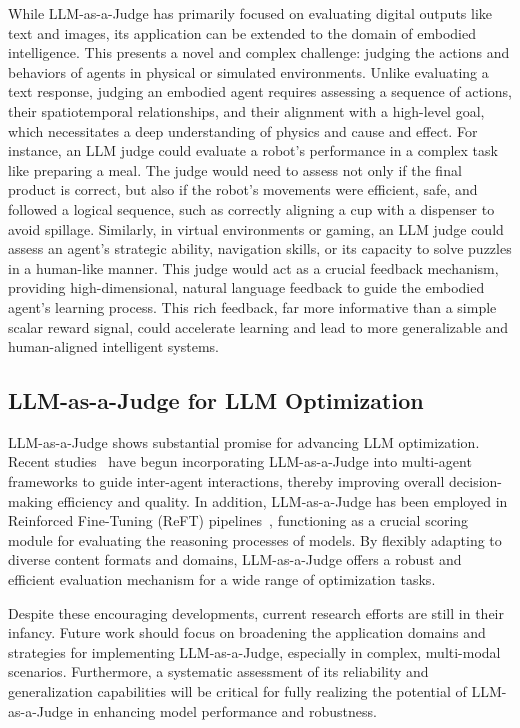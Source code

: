 While LLM-as-a-Judge has primarily focused on evaluating digital outputs like text and images, its application can be extended to the domain of embodied intelligence. This presents a novel and complex challenge: judging the actions and behaviors of agents in physical or simulated environments. Unlike evaluating a text response, judging an embodied agent requires assessing a sequence of actions, their spatiotemporal relationships, and their alignment with a high-level goal, which necessitates a deep understanding of physics and cause and effect. For instance, an LLM judge could evaluate a robot's performance in a complex task like preparing a meal. The judge would need to assess not only if the final product is correct, but also if the robot's movements were efficient, safe, and followed a logical sequence, such as correctly aligning a cup with a dispenser to avoid spillage. Similarly, in virtual environments or gaming, an LLM judge could assess an agent's strategic ability, navigation skills, or its capacity to solve puzzles in a human-like manner. This judge would act as a crucial feedback mechanism, providing high-dimensional, natural language feedback to guide the embodied agent's learning process. This rich feedback, far more informative than a simple scalar reward signal, could accelerate learning and lead to more generalizable and human-aligned intelligent systems.




\subsection{LLM-as-a-Judge for LLM Optimization}
LLM-as-a-Judge shows substantial promise for advancing LLM optimization. Recent studies~\cite{aaaj} have begun incorporating LLM-as-a-Judge into multi-agent frameworks to guide inter-agent interactions, thereby improving overall decision-making efficiency and quality. In addition, LLM-as-a-Judge has been employed in Reinforced Fine-Tuning (ReFT) pipelines~\cite{trung2024reft}, functioning as a crucial scoring module for evaluating the reasoning processes of models. By flexibly adapting to diverse content formats and domains, LLM-as-a-Judge offers a robust and efficient evaluation mechanism for a wide range of optimization tasks.

Despite these encouraging developments, current research efforts are still in their infancy. Future work should focus on broadening the application domains and strategies for implementing LLM-as-a-Judge, especially in complex, multi-modal scenarios. Furthermore, a systematic assessment of its reliability and generalization capabilities will be critical for fully realizing the potential of LLM-as-a-Judge in enhancing model performance and robustness.






